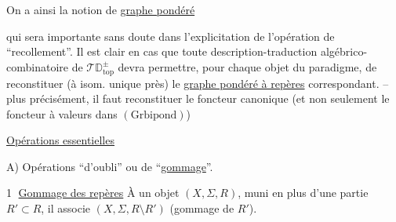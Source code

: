 On a ainsi la notion de \uline{graphe pondéré} 

qui sera importante sans doute dans l'explicitation de l'opération de ``recollement''. Il est clair en  cas que toute description-traduction algébrico-combinatoire de $\mathscr T\mathbb D_{\mathrm{top}}^{\pm}$ devra permettre, pour chaque objet du  paradigme, de reconstituer (à isom. unique près) le \uline{graphe pondéré à repères} correspondant. -- plus précisément, il faut reconstituer le foncteur canonique
(et non seulement le foncteur à valeurs dans $(\mathrm{Grbipond})$)

\uline{Opérations essentielles}

A) Opérations ``d'oubli'' ou de ``\uline{gommage}''.

\textcircled{1} \uline{Gommage des repères} À un objet $(X,\Sigma,R)$, muni en plus d'une partie $R'\subset R$, il associe $(X,\Sigma,R\setminus R')$ (gommage de $R'$).
